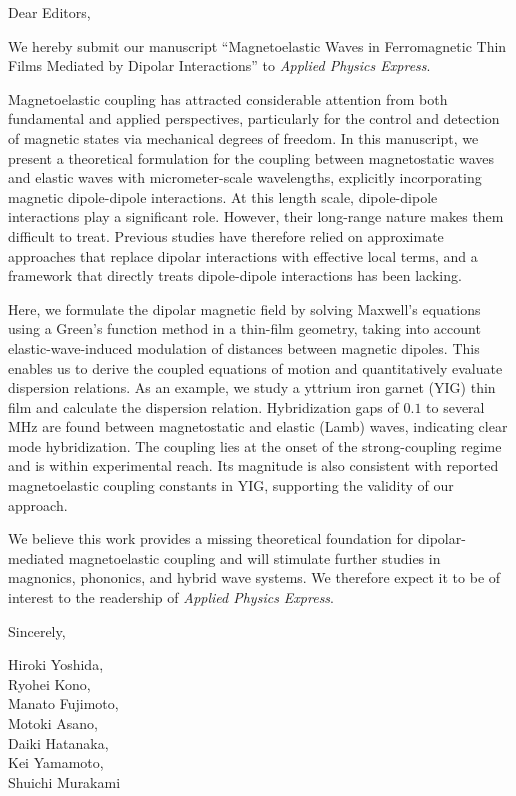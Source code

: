 \documentclass[12pt]{letter}
\begin{document}
\begin{letter}{}
\opening{Dear Editors,}

We hereby submit our manuscript ``Magnetoelastic Waves in Ferromagnetic Thin Films Mediated by Dipolar Interactions'' to \textit{Applied Physics Express}.

Magnetoelastic coupling has attracted considerable attention from both fundamental and applied perspectives, particularly for the control and detection of magnetic states via mechanical degrees of freedom. In this manuscript, we present a theoretical formulation for the coupling between magnetostatic waves and elastic waves with micrometer-scale wavelengths, explicitly incorporating magnetic dipole-dipole interactions. At this length scale, dipole-dipole interactions play a significant role. However, their long-range nature makes them difficult to treat. Previous studies have therefore relied on approximate approaches that replace dipolar interactions with effective local terms, and a framework that directly treats dipole-dipole interactions has been lacking.

Here, we formulate the dipolar magnetic field by solving Maxwell's equations using a Green's function method in a thin-film geometry, taking into account elastic-wave-induced modulation of distances between magnetic dipoles. This enables us to derive the coupled equations of motion and quantitatively evaluate dispersion relations. As an example, we study a yttrium iron garnet (YIG) thin film and calculate the dispersion relation. Hybridization gaps of $0.1$ to several MHz are found between magnetostatic and elastic (Lamb) waves, indicating clear mode hybridization. The coupling lies at the onset of the strong-coupling regime and is within experimental reach. Its magnitude is also consistent with reported magnetoelastic coupling constants in YIG, supporting the validity of our approach.

We believe this work provides a missing theoretical foundation for dipolar-mediated magnetoelastic coupling and will stimulate further studies in magnonics, phononics, and hybrid wave systems. We therefore expect it to be of interest to the readership of \textit{Applied Physics Express}.

Sincerely,

Hiroki Yoshida,\\
Ryohei Kono,\\
Manato Fujimoto,\\
Motoki Asano,\\
Daiki Hatanaka,\\
Kei Yamamoto,\\
Shuichi Murakami

\end{letter}
\end{document}
